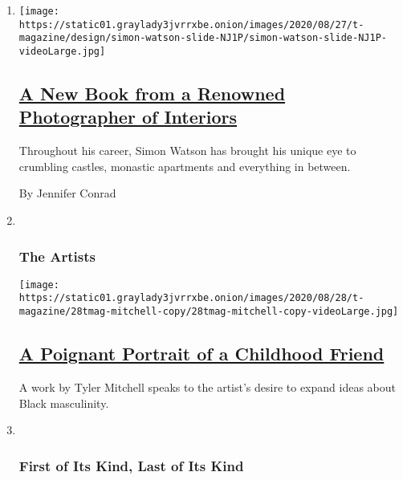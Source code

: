 \begin{enumerate}
\def\labelenumi{\arabic{enumi}.}
\item
  \texttt{[image: https://static01.graylady3jvrrxbe.onion/images/2020/08/27/t-magazine/design/simon-watson-slide-NJ1P/simon-watson-slide-NJ1P-videoLarge.jpg]}

  \hypertarget{a-new-book-from-a-renowned-photographer-of-interiors}{%
  \subsection{\texorpdfstring{\href{/2020/08/31/t-magazine/simon-watson-photographer-book-design.html}{A
  New Book from a Renowned Photographer of
  Interiors}}{A New Book from a Renowned Photographer of Interiors}}\label{a-new-book-from-a-renowned-photographer-of-interiors}}

  Throughout his career, Simon Watson has brought his unique eye to
  crumbling castles, monastic apartments and everything in between.

  By Jennifer Conrad
\item ~
  \hypertarget{the-artists}{%
  \subsubsection{The Artists}\label{the-artists}}

  \texttt{[image: https://static01.graylady3jvrrxbe.onion/images/2020/08/28/t-magazine/28tmag-mitchell-copy/28tmag-mitchell-copy-videoLarge.jpg]}

  \hypertarget{a-poignant-portrait-of-a-childhood-friend}{%
  \subsection{\texorpdfstring{\href{/2020/08/28/t-magazine/tyler-mitchell-photographer-artist.html}{A
  Poignant Portrait of a Childhood
  Friend}}{A Poignant Portrait of a Childhood Friend}}\label{a-poignant-portrait-of-a-childhood-friend}}

  A work by Tyler Mitchell speaks to the artist's desire to expand ideas
  about Black masculinity.
\item ~
  \hypertarget{first-of-its-kind-last-of-its-kind}{%
  \subsubsection{First of Its Kind, Last of Its
  Kind}\label{first-of-its-kind-last-of-its-kind}}


\end{enumerate}
